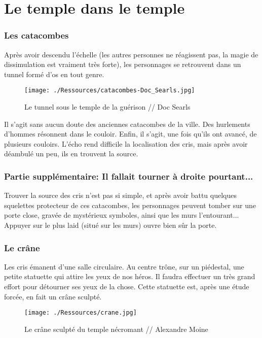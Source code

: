 \documentclass[a4paper, 11pt]{article}
\begin{document}
\section{Le temple dans le temple} 
\subsubsection{Les catacombes}
Après avoir descendu l'échelle (les autres personnes ne réagissent pas, la magie de dissimulation est vraiment très forte), les personnages se retrouvent dans un tunnel formé d'os en tout genre.

\begin{figure}[ht]
\begin{center}
\hypertarget{catacombes}{}
\texttt{[image: ./Ressources/catacombes-Doc\_Searls.jpg]}
\caption{Le tunnel sous le temple de la guérison // Doc Searls }
\end{center}
\end{figure}

Il s'agit sans aucun doute des anciennes catacombes de la ville. Des hurlements d'hommes résonnent dans le couloir. Enfin, il s'agit, une fois qu'ils ont avancé, de plusieurs couloirs. L'écho rend difficile la localisation des cris, mais après avoir déambulé un peu, ils en trouvent la source.

\subsubsection{Partie supplémentaire: Il fallait tourner à droite pourtant...}
Trouver la source des cris n'est pas si simple, et après avoir battu quelques squelettes protecteur de ces catacombes, les personnages peuvent tomber sur une porte close, gravée de mystérieux symboles, ainsi que les murs l'entourant... Appuyer sur le plus laid (situé sur les murs) ouvre bien sûr la porte.

\subsubsection{Le crâne}
Les cris émanent d'une salle circulaire. Au centre trône, sur un piédestal, une petite statuette qui attire les yeux de nos héros. Il faudra effectuer un très grand effort pour détourner ses yeux de la chose. Cette statuette est, après une étude forcée, en fait un crâne sculpté.

\begin{figure}[ht]
\begin{center}
\hypertarget{crane}{}
\texttt{[image: ./Ressources/crane.jpg]}
\caption{Le crâne sculpté du temple nécromant // Alexandre Moine }
\end{center}
\end{figure}
\end{document}
